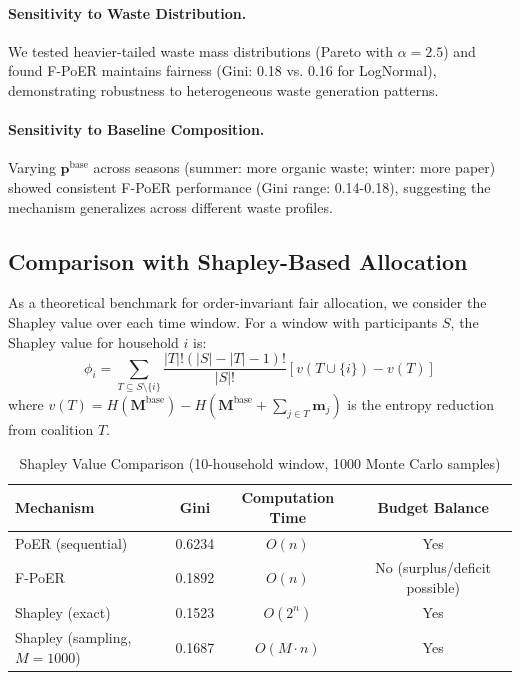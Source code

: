 \documentclass[12pt,a4paper]{article}
\begin{document}
\paragraph{Sensitivity to Waste Distribution.} We tested heavier-tailed waste mass distributions (Pareto with $\alpha=2.5$) and found F-PoER maintains fairness (Gini: 0.18 vs. 0.16 for LogNormal), demonstrating robustness to heterogeneous waste generation patterns.

\paragraph{Sensitivity to Baseline Composition.} Varying $\mathbf{p}^{\text{base}}$ across seasons (summer: more organic waste; winter: more paper) showed consistent F-PoER performance (Gini range: 0.14-0.18), suggesting the mechanism generalizes across different waste profiles.

\subsection{Comparison with Shapley-Based Allocation}

As a theoretical benchmark for order-invariant fair allocation, we consider the Shapley value\cite{shapley1953value} over each time window. For a window with participants $S$, the Shapley value for household $i$ is:
\begin{equation}
\phi_i = \sum_{T \subseteq S \setminus \{i\}} \frac{|T|! (|S|-|T|-1)!}{|S|!} \left[ v(T \cup \{i\}) - v(T) \right]
\end{equation}
where $v(T) = H(\mathbf{M}^{\text{base}}) - H(\mathbf{M}^{\text{base}} + \sum_{j \in T} \mathbf{m}_j)$ is the entropy reduction from coalition $T$.

\begin{table}[h]
\centering
\caption{Shapley Value Comparison (10-household window, 1000 Monte Carlo samples)}
\label{tab:shapley}
\begin{tabular}{lccc}
\toprule
\textbf{Mechanism} & \textbf{Gini} & \textbf{Computation Time} & \textbf{Budget Balance} \\
\midrule
PoER (sequential) & 0.6234 & $O(n)$ & Yes \\
F-PoER & 0.1892 & $O(n)$ & No (surplus/deficit possible) \\
Shapley (exact) & 0.1523 & $O(2^n)$ & Yes \\
Shapley (sampling, $M=1000$) & 0.1687 & $O(M \cdot n)$ & Yes \\
\bottomrule
\end{tabular}
\end{table}
\end{document}
